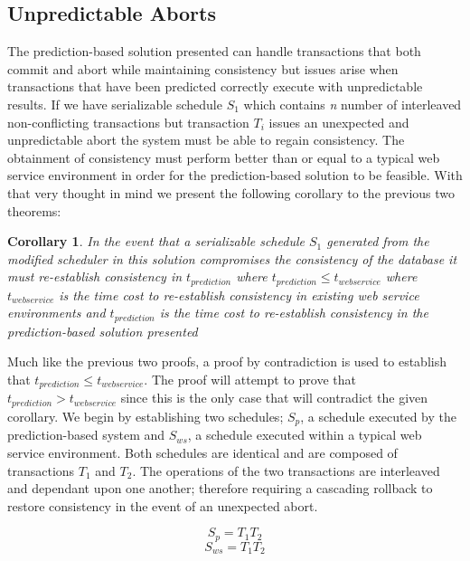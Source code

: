 \documentclass[conference]{IEEEtran}
\newtheorem{corollary}{Corollary}[theorem]
\begin{document}
\subsection{Unpredictable Aborts}
The prediction-based solution presented can handle transactions that both commit and abort while maintaining consistency but issues arise when transactions that have been predicted correctly execute with unpredictable results. If we have serializable schedule $S_{1}$ which contains \textit{n} number of interleaved non-conflicting transactions but transaction $T_{i}$ issues an unexpected and unpredictable abort the system must be able to regain consistency. The obtainment of consistency must perform better than or equal to a typical web service environment in order for the prediction-based solution to be feasible. With that very thought in mind we present the following corollary to the previous two theorems:

\begin{corollary}
\label{corollary1}
 In the event that a serializable schedule $S_{1}$ generated from the modified scheduler in this solution compromises the consistency of the database it must re-establish consistency in $t_{prediction}$ where $t_{prediction} \le t_{web service}$ where $t_{web service}$ is the time cost to re-establish consistency in existing web service environments and $t_{prediction}$ is the time cost to re-establish consistency in the prediction-based solution presented
\end{corollary}

Much like the previous two proofs, a proof by contradiction is used to establish that $t_{prediction} \le t_{web service}$. The proof will attempt to prove that $t_{prediction} > t_{web service}$ since this is the only case that will contradict the given corollary. We begin by establishing two schedules; $S_{p}$, a schedule executed by the prediction-based system and $S_{ws}$, a schedule executed within a typical web service environment. Both schedules are identical and are composed of transactions $T_{1}$ and $T_{2}$. The operations of the two transactions are interleaved and dependant upon one another; therefore requiring a cascading rollback to restore consistency in the event of an unexpected abort.

\[\textrm{$S_{p} = T_{1}T_{2}$}\]
\[\textrm{$S_{ws} = T_{1}T_{2}$}\]
\end{document}
